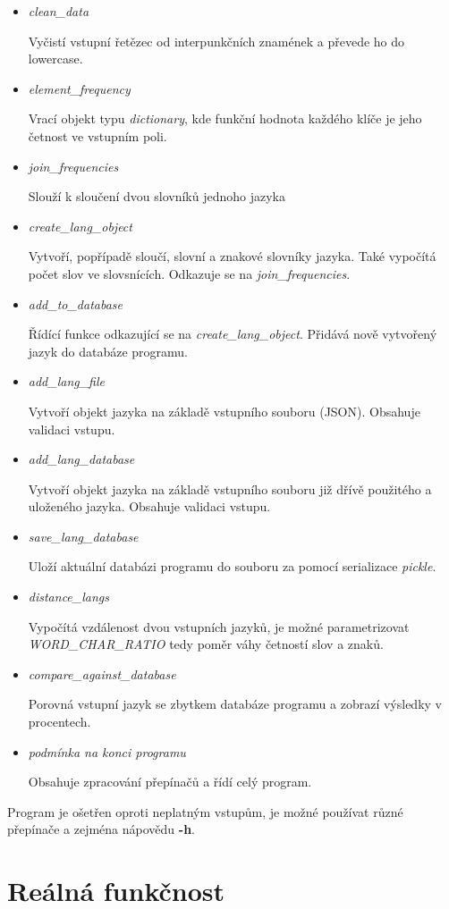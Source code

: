\documentclass[11pt]{article}
\begin{document}
\begin{itemize}
\item \textit{clean\_data}

Vyčistí vstupní řetězec od interpunkčních znamének a převede ho do lowercase.
\item \textit{element\_frequency}

Vrací objekt typu \textit{dictionary}, kde funkční hodnota každého klíče je jeho četnost ve vstupním poli.
\item \textit{join\_frequencies}

Slouží k sloučení dvou slovníků jednoho jazyka
\item \textit{create\_lang\_object}

Vytvoří, popřípadě sloučí, slovní a znakové slovníky jazyka. Také vypočítá počet slov ve slovsnících. Odkazuje se na \textit{join\_frequencies}.
\item \textit{add\_to\_database}

Řídící funkce odkazující se na \textit{create\_lang\_object}. Přidává nově vytvořený jazyk do databáze programu.
\item \textit{add\_lang\_file}

Vytvoří objekt jazyka na základě vstupního souboru (JSON). Obsahuje validaci vstupu.
\item \textit{add\_lang\_database}

Vytvoří objekt jazyka na základě vstupního souboru již dřívě použitého a uloženého jazyka. Obsahuje validaci vstupu.
\item \textit{save\_lang\_database}

Uloží aktuální databázi programu do souboru za pomocí serializace \textit{pickle}.
\item \textit{distance\_langs}

Vypočítá vzdálenost dvou vstupních jazyků, je možné parametrizovat \textit{WORD\_CHAR\_RATIO} tedy poměr váhy četností slov a znaků.
\item \textit{compare\_against\_database}

Porovná vstupní jazyk se zbytkem databáze programu a zobrazí výsledky v procentech.
\item \textit{podmínka na konci programu}

Obsahuje zpracování přepínačů a řídí celý program.
\end{itemize}

Program je ošetřen oproti neplatným vstupům, je možné používat různé přepínače a zejména nápovědu \textbf{-h}.

\section{Reálná funkčnost}
\end{document}
